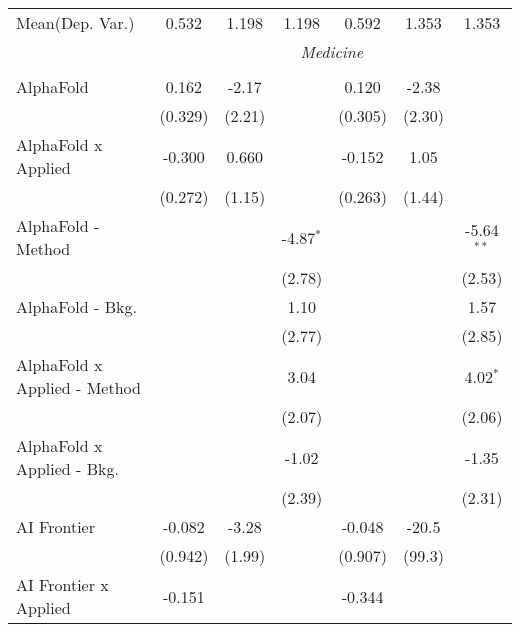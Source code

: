 \begin{tabular}{lcccccc}
Mean(Dep. Var.) & 0.532 & 1.198 & 1.198 & 0.592 & 1.353 & 1.353 \\
 & \multicolumn{6}{c}{\textit{Medicine}} \\ \\
   AlphaFold                    & 0.162         & -2.17      &               & 0.120         & -2.38       &   \\   
                                & (0.329)       & (2.21)     &               & (0.305)       & (2.30)      &   \\   
   AlphaFold x Applied          & -0.300        & 0.660      &               & -0.152        & 1.05        &   \\   
                                & (0.272)       & (1.15)     &               & (0.263)       & (1.44)      &   \\   
   AlphaFold - Method           &               &            & -4.87$^{*}$   &               &             & -5.64$^{**}$\\   
                                &               &            & (2.78)        &               &             & (2.53)\\   
   AlphaFold - Bkg.             &               &            & 1.10          &               &             & 1.57\\   
                                &               &            & (2.77)        &               &             & (2.85)\\   
   AlphaFold x Applied - Method &               &            & 3.04          &               &             & 4.02$^{*}$\\   
                                &               &            & (2.07)        &               &             & (2.06)\\   
   AlphaFold x Applied - Bkg.   &               &            & -1.02         &               &             & -1.35\\   
                                &               &            & (2.39)        &               &             & (2.31)\\   
   AI Frontier                  & -0.082        & -3.28      &               & -0.048        & -20.5       &   \\   
                                & (0.942)       & (1.99)     &               & (0.907)       & (99.3)      &   \\   
   AI Frontier x Applied        & -0.151        &            &               & -0.344        &             &   \\   

\end{tabular}
